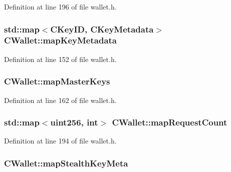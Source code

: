 Definition at line 196 of file wallet.\+h.

\hypertarget{class_c_wallet_acfd09bc5a2daee930f9f988efac8dbb7}{}
\subsubsection[{map\+Key\+Metadata}]{\setlength{\rightskip}{0pt plus 5cm}std\+::map$<${\bf C\+Key\+I\+D}, {\bf C\+Key\+Metadata}$>$ C\+Wallet\+::map\+Key\+Metadata}\label{class_c_wallet_acfd09bc5a2daee930f9f988efac8dbb7}


Definition at line 152 of file wallet.\+h.

\hypertarget{class_c_wallet_a23c5badf56c297a95557af3073d4aa32}{}
\subsubsection[{map\+Master\+Keys}]{ C\+Wallet\+::map\+Master\+Keys}\label{class_c_wallet_a23c5badf56c297a95557af3073d4aa32}


Definition at line 162 of file wallet.\+h.

\hypertarget{class_c_wallet_ade5f0fc0e722433b421c32f97bd873a8}{}
\subsubsection[{map\+Request\+Count}]{\setlength{\rightskip}{0pt plus 5cm}std\+::map$<${\bf uint256}, int$>$ C\+Wallet\+::map\+Request\+Count}\label{class_c_wallet_ade5f0fc0e722433b421c32f97bd873a8}


Definition at line 194 of file wallet.\+h.

\hypertarget{class_c_wallet_aeb612f84011f0b02c070c2d39594b9fb}{}
\subsubsection[{map\+Stealth\+Key\+Meta}]{ C\+Wallet\+::map\+Stealth\+Key\+Meta}\label{class_c_wallet_aeb612f84011f0b02c070c2d39594b9fb}


